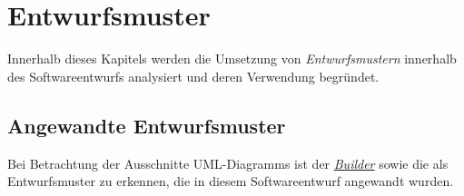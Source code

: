 \chapter{Entwurfsmuster}
\label{entwurfsmuster}
Innerhalb dieses Kapitels werden die Umsetzung von \textit{Entwurfsmustern} innerhalb des Softwareentwurfs analysiert und deren Verwendung begründet.


\section{Angewandte Entwurfsmuster}
Bei Betrachtung der Ausschnitte UML-Diagramms ist der \href{https://github.com/lucasmerkel/dhbw-advancedswe-programmentwurf/blob/2bab7b1c200507e4550ce7025485261d0e95ce07/Documentation/Bilder/uml-diagramme/uml-entwurfsmuster-builder.svg}{\textit{Builder}} sowie die \href{https://github.com/lucasmerkel/dhbw-advancedswe-programmentwurf/blob/d5c89113d12c3b877ddc4d6a99225b277ddd468f/Documentation/Bilder/uml-diagramme/uml-entwurfsmuster-bridge.svg}{} als Entwurfsmuster zu erkennen, die in diesem Softwareentwurf angewandt wurden.



